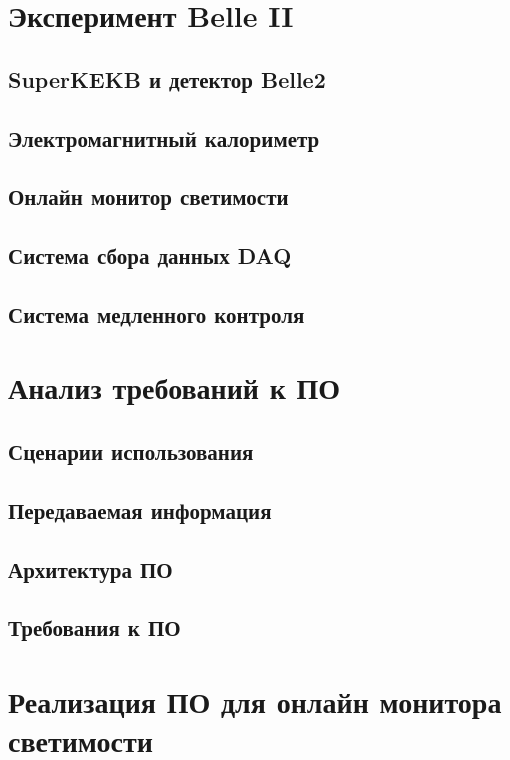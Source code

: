 \documentclass[a4paper, 12pt]{article}
\begin{document}
\section{Эксперимент Belle II}
    \subsection{SuperKEKB и детектор Belle2}
    
    \subsection{Электромагнитный калориметр}
    
    \subsection{Онлайн монитор светимости}
    
    \subsection{Система сбора данных DAQ}
    
    \subsection{Система медленного контроля}
    
\section{Анализ требований к ПО}
    \subsection{Сценарии использования}
    
    \subsection{Передаваемая информация}
    
    \subsection{Архитектура ПО}
    
    \subsection{Требования к ПО}
    
\section{Реализация ПО для онлайн монитора светимости}
\end{document}
